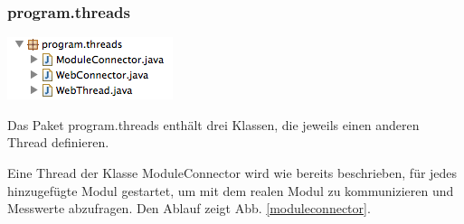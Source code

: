 \documentclass[a4paper,14pt,headsepline]{scrartcl}
\begin{document}
\newpage

\subsubsection*{program.threads}

\includegraphics[width=0.22 \paperwidth]{./bilder/lib_threads.png}

Das Paket program.threads enthält drei Klassen, die jeweils einen anderen Thread definieren. 

Eine Thread der Klasse ModuleConnector wird wie bereits beschrieben, für jedes hinzugefügte Modul gestartet, um mit dem realen Modul zu kommunizieren und Messwerte abzufragen. Den Ablauf zeigt Abb. \ref{moduleconnector}.

\begin{figure}[h]
\begin{center}
\end{center}
\end{figure}
\end{document}
